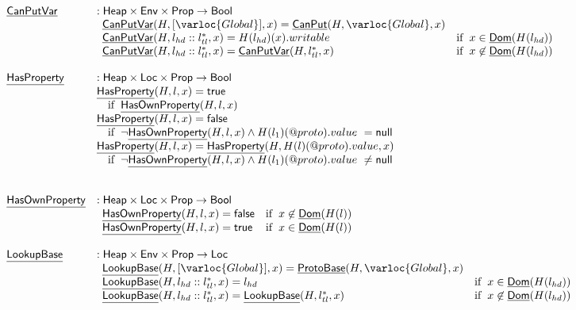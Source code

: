 \[\begin{array}{ll}
\chf{CanPutVar} & : \SF{Heap} \times \SF{Env} \times \SF{Prop} \rightarrow \SF{Bool}\\
&
\begin{array}{ll}
  \chf{CanPutVar}(H,[\varloc{Global}],x)
  =  \chf{CanPut}(H,\varloc{Global},x) \\
\chf{CanPutVar}(H,l_{hd}::l^{*}_{tl},x)
  =  H(l_{hd})(x).writable & \ifc{x\in\chf{Dom}(H(l_{hd}))} \\
\chf{CanPutVar}(H,l_{hd}::l^{*}_{tl},x)
  =  \chf{CanPutVar}(H,l^{*}_{tl},x) & \ifc{x\not\in\chf{Dom}(H(l_{hd}))} \\
\end{array}\\
\\

\chf{HasProperty} & : \SF{Heap} \times \SF{Loc} \times \SF{Prop} \rightarrow \SF{Bool} \\
& \chf{HasProperty}(H,l,x) = \vtrue \\
& \quad\ifc{\chf{HasOwnProperty}(H,l,x)} \\
& \chf{HasProperty}(H,l,x) = \vfalse \\
& \quad\ifc{\lnot\chf{HasOwnProperty}(H,l,x) \land H(l_1)(\varprop{proto}).value\ = \SF{null}}\\
& \chf{HasProperty}(H,l,x) = \chf{HasProperty}(H,H(l)(\varprop{proto}).value,x)\\
& \quad\ifc{\lnot\chf{HasOwnProperty}(H,l,x) \land H(l_1)(\varprop{proto}).value\ \neq \SF{null}} \\
\\
\\

\chf{HasOwnProperty} & : \SF{Heap} \times \SF{Loc} \times \SF{Prop} \rightarrow \SF{Bool} \\
&
\begin{array}{ll}
  \chf{HasOwnProperty}(H,l,x) = \vfalse & \ifc{x\not\in\chf{Dom}(H(l))} \\
  \chf{HasOwnProperty}(H,l,x) = \vtrue & \ifc{x\in\chf{Dom}(H(l))} \\
\end{array}\\
\\
\chf{LookupBase} & : \SF{Heap} \times \SF{Env} \times \SF{Prop} \rightarrow \SF{Loc} \\
&
\begin{array}{ll}
\chf{LookupBase}(H,[\varloc{Global}],x)
= \chf{ProtoBase}(H, \varloc{Global}, x) \\
\chf{LookupBase}(H,l_{hd}::l_{tl}^{*},x)
= l_{hd} & \ifc{x\in\chf{Dom}(H(l_{hd}))} \\
\chf{LookupBase}(H,l_{hd}::l_{tl}^{*},x)
= \chf{LookupBase}(H, l_{tl}^{*},x) & \ifc{x\not\in\chf{Dom}(H(l_{hd}))} \\
\end{array}\\
\\
\end{array}
\]
